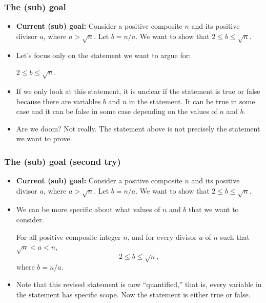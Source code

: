\documentclass{beamer}
\begin{document}
\begin{frame}\frametitle{The (sub) goal}
  \begin{itemize}
  \item
    {\bf Current (sub) goal:} Consider a positive composite $n$ and its
    positive divisor $a$, where $a>\sqrt{n}$.  Let $b=n/a$.  We want
    to show that $2\leq b\leq\sqrt{n}$.
    \pause
  \item Let's focus only on the statement we want to argue for:
    \pause

    \begin{tcolorbox}
      \begin{center}
        $2\leq b\leq\sqrt{n}$.
      \end{center}
    \end{tcolorbox}
    
    \pause
  \item If we only look at this statement, it is unclear if the
    statement is true or false because there are variables $b$ and $n$
    in the statement.  It can be true in some case and it can be false
    in some case depending on the values of $n$ and $b$.

    \pause

  \item Are we doom? \pause Not really.  The statement above is not
    precisely the statement we want to prove.
  \end{itemize}
\end{frame}

\begin{frame}\frametitle{The (sub) goal (second try)}
  \begin{itemize}
  \item
    {\small {\bf Current (sub) goal:} Consider a positive composite $n$ and its
    positive divisor $a$, where $a>\sqrt{n}$.  Let $b=n/a$.  We want
    to show that $2\leq b\leq\sqrt{n}$.}

  \item We can be more specific about what values of $n$ and $b$ that
    we want to consider. \pause

    \begin{tcolorbox}[title=Revised statement]
      For all positive composite integer $n$, and for every divisor
      $a$ of $n$ such that $\sqrt{n} < a < n$,
      \[ 2\leq b\leq\sqrt{n},\]
      where $b=n/a$.
    \end{tcolorbox}

  \item Note that this revised statement is now ``quantified,'' that
    is, every variable in the statement has specific scope.  Now the
    statement is either true or false.
  \end{itemize}
\end{frame}
\end{document}
